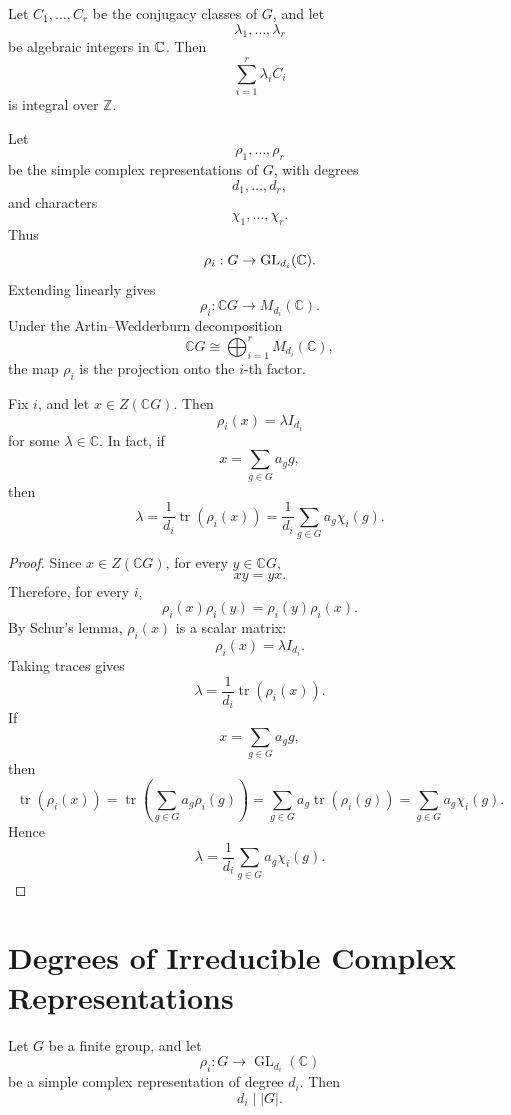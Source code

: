 \begin{corollary}
Let \(C_1,\dots,C_r\) be the conjugacy classes of \(G\), and let
\[
\lambda_1,\dots,\lambda_r
\]
be algebraic integers in \(\mathbb{C}\). Then
\[
\sum_{i=1}^r \lambda_i\overline C_i
\]
is integral over \(\mathbb{Z}\).
\end{corollary}

Let
\[
\rho_1,\dots,\rho_r
\]
be the simple complex representations of \(G\), with degrees
\[
d_1,\dots,d_r,
\]
and characters
\[
\chi_1,\dots,\chi_r.
\]
Thus
\[
\rho_i:G\to \operatorname{GL}_{d_i}(\mathbb{C}).
\]
Extending linearly gives
\[
\rho_i:\mathbb{C}G\to M_{d_i}(\mathbb{C}).
\]
Under the Artin--Wedderburn decomposition
\[
\mathbb{C}G\cong \bigoplus_{i=1}^r M_{d_i}(\mathbb{C}),
\]
the map \(\rho_i\) is the projection onto the \(i\)-th factor.

\begin{proposition}
Fix \(i\), and let \(x\in Z(\mathbb{C}G)\). Then
\[
\rho_i(x)=\lambda I_{d_i}
\]
for some \(\lambda\in\mathbb{C}\). In fact, if
\[
x=\sum_{g\in G} a_g g,
\]
then
\[
\lambda
=
\frac{1}{d_i}\operatorname{tr}(\rho_i(x))
=
\frac{1}{d_i}\sum_{g\in G} a_g\chi_i(g).
\]
\end{proposition}

\begin{proof}
Since \(x\in Z(\mathbb{C}G)\), for every \(y\in \mathbb{C}G\),
\[
xy=yx.
\]
Therefore, for every \(i\),
\[
\rho_i(x)\rho_i(y)=\rho_i(y)\rho_i(x).
\]
By Schur's lemma, \(\rho_i(x)\) is a scalar matrix:
\[
\rho_i(x)=\lambda I_{d_i}.
\]
Taking traces gives
\[
\lambda
=
\frac{1}{d_i}\operatorname{tr}(\rho_i(x)).
\]
If
\[
x=\sum_{g\in G}a_g g,
\]
then
\[
\operatorname{tr}(\rho_i(x))
=
\operatorname{tr}\left(\sum_{g\in G}a_g\rho_i(g)\right)
=
\sum_{g\in G}a_g\operatorname{tr}(\rho_i(g))
=
\sum_{g\in G}a_g\chi_i(g).
\]
Hence
\[
\lambda
=
\frac{1}{d_i}\sum_{g\in G}a_g\chi_i(g).
\]
\end{proof}

\section{Degrees of Irreducible Complex Representations}

\begin{theorem}
Let \(G\) be a finite group, and let
\[
\rho_i:G\to \operatorname{GL}_{d_i}(\mathbb{C})
\]
be a simple complex representation of degree \(d_i\). Then
\[
d_i \mid |G|.
\]
\end{theorem}

